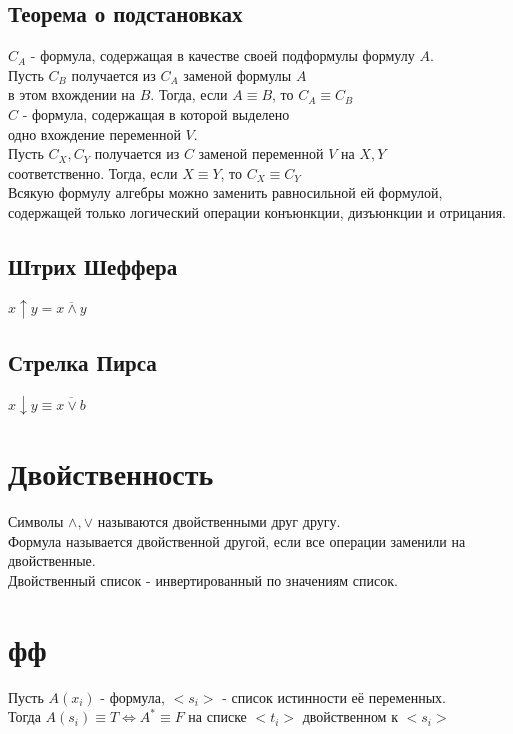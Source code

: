 \documentclass[letterpaper]{article}
\begin{document}
\subsection{Теорема о подстановках}
\label{sec:org798e030}
\(C_A\) - формула, содержащая в качестве своей подформулы формулу \(A\).\\
Пусть \(C_B\) получается из \(C_A\) заменой формулы \(A\)\\
в этом вхождении на \(B\). Тогда, если \(A \equiv B\), то \(C_A \equiv C_B\)\\

\(C\) - формула, содержащая в которой выделено\\
одно вхождение переменной \(V\).\\
Пусть \(C_X, C_Y\) получается из \(C\) заменой переменной \(V\) на \(X, Y\)\\
соответственно. Тогда, если \(X \equiv Y\), то \(C_X \equiv C_Y\)\\

Всякую формулу алгебры можно заменить равносильной ей формулой, содержащей только логический операции конъюнкции, дизъюнкции и отрицания.\\
\subsection{Штрих Шеффера}
\label{sec:orgd92af91}
\(x \uparrow y = \overline{x \land y}\)\\
\subsection{Стрелка Пирса}
\label{sec:orgc862ce8}
\(x \downarrow y \equiv \overline{x \lor b}\)\\
\section{Двойственность}
\label{sec:org286e1aa}
Символы \(\land, \lor\) называются двойственными друг другу.\\

Формула называется двойственной другой, если все операции заменили на двойственные.\\

Двойственный список - инвертированный по значениям список.\\
\section{фф}
\label{sec:orgf2fd83f}
Пусть \(A(x_i)\) - формула, \(<s_i>\) - список истинности её переменных.\\
Тогда \(A(s_i) \equiv T \iff A^* \equiv F\) на списке \(<t_i>\) двойственном к \(<s_i>\)\\
\end{document}
